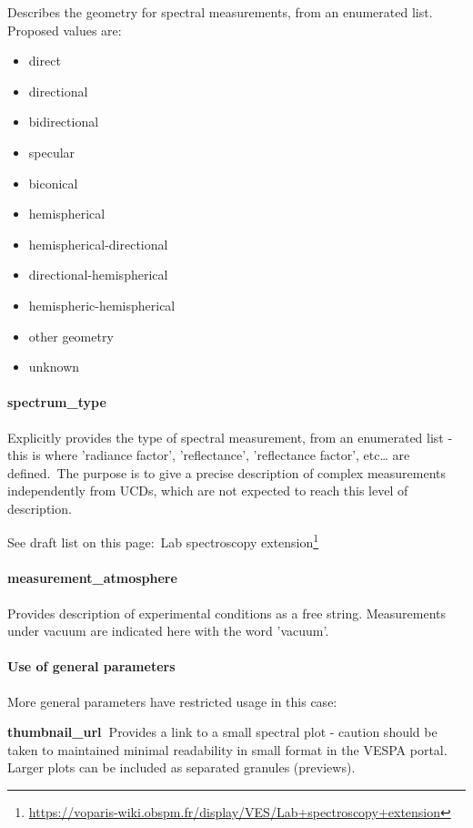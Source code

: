 \documentclass[11pt,a4paper]{ivoa}
\begin{document}
Describes the geometry for spectral measurements, from an enumerated list. Proposed values are:

\begin{itemize}
\item direct
\item directional
\item bidirectional
\item specular
\item biconical
\item hemispherical
\item hemispherical-directional
\item directional-hemispherical
\item hemispheric-hemispherical
\item other geometry
\item unknown
\end{itemize}

\paragraph{spectrum\_type}

Explicitly provides the type of spectral measurement, from an enumerated list - this is where 'radiance factor', 'reflectance', 'reflectance factor', etc… are defined. The purpose is to give a precise description of complex measurements independently from UCDs, which are not expected to reach this level of description.

See draft list on this page: Lab spectroscopy extension\footnote{\url{https://voparis-wiki.obspm.fr/display/VES/Lab+spectroscopy+extension}}

\paragraph{measurement\_atmosphere}

Provides description of experimental conditions as a free string. Measurements under vacuum are indicated here with the word 'vacuum'.

\paragraph{Use of general parameters\textbf{ }}

More general parameters have restricted usage in this case:

\textbf{thumbnail\_url }Provides a link to a small spectral plot - caution should be taken to maintained minimal readability in small format in the VESPA portal. Larger plots can be included as separated granules (previews).
\end{document}
